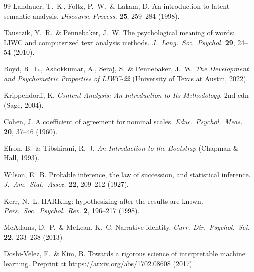 \documentclass[fleqn,10pt]{wlscirep}
\begin{document}
\begin{thebibliography}{99}
Landauer, T.\ K., Foltz, P.\ W.\ \& Laham, D.
An introduction to latent semantic analysis.
\emph{Discourse Process.} \textbf{25}, 259--284 (1998).

Tausczik, Y.\ R.\ \& Pennebaker, J.\ W.
The psychological meaning of words: LIWC and computerized text analysis methods.
\emph{J.\ Lang.\ Soc.\ Psychol.} \textbf{29}, 24--54 (2010).

Boyd, R.\ L., Ashokkumar, A., Seraj, S.\ \& Pennebaker, J.\ W.
\emph{The Development and Psychometric Properties of LIWC-22}
(University of Texas at Austin, 2022).

Krippendorff, K.
\emph{Content Analysis: An Introduction to Its Methodology}, 2nd edn
(Sage, 2004).

Cohen, J.
A coefficient of agreement for nominal scales.
\emph{Educ.\ Psychol.\ Meas.} \textbf{20}, 37--46 (1960).

Efron, B.\ \& Tibshirani, R.\ J.
\emph{An Introduction to the Bootstrap}
(Chapman \& Hall, 1993).

Wilson, E.\ B.
Probable inference, the law of succession, and statistical inference.
\emph{J.\ Am.\ Stat.\ Assoc.} \textbf{22}, 209--212 (1927).

Kerr, N.\ L.
HARKing: hypothesizing after the results are known.
\emph{Pers.\ Soc.\ Psychol.\ Rev.} \textbf{2}, 196--217 (1998).

McAdams, D.\ P.\ \& McLean, K.\ C.
Narrative identity.
\emph{Curr.\ Dir.\ Psychol.\ Sci.} \textbf{22}, 233--238 (2013).

Doshi-Velez, F.\ \& Kim, B.
Towards a rigorous science of interpretable machine learning.
Preprint at \url{https://arxiv.org/abs/1702.08608} (2017).

\end{thebibliography}
\end{document}
